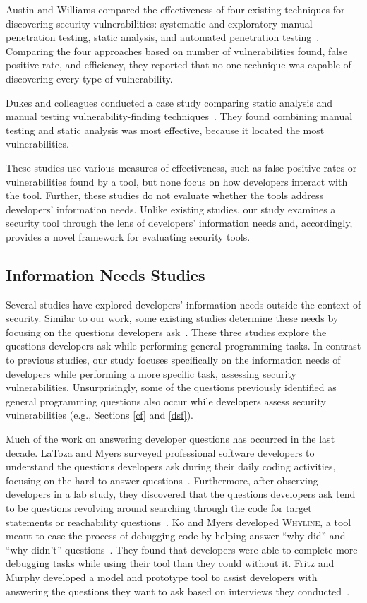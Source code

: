 \documentclass[10pt,journal,compsoc]{IEEEtran}
\begin{document}
Austin and Williams compared the effectiveness of four existing techniques for discovering security vulnerabilities: systematic and exploratory manual  penetration testing, static analysis, and automated penetration testing~\cite{austin2011one}. 
Comparing the four approaches based on number of vulnerabilities found, false positive rate, and efficiency, they reported that no one technique was capable of discovering every type of vulnerability. 

Dukes and colleagues conducted a case study comparing static analysis and manual testing vulnerability-finding techniques~\cite{dukes2013case}. 
They found combining manual testing and static analysis was most effective, because it located the most vulnerabilities.

These studies use various measures of effectiveness, such as false positive rates or vulnerabilities found by a tool, but none focus on how developers interact with the tool. 
Further, these studies do not evaluate whether the tools address developers' information needs. 
Unlike existing studies, our study examines a security tool through the lens of developers' information needs and, accordingly, provides a novel framework for evaluating security tools.

\subsection{Information Needs Studies}
\label{questions}
Several studies have explored developers' information needs outside the context of security.
Similar to our work, some existing studies determine these needs by focusing on the questions developers ask~\cite{latoza2010hard, latoza2010developers, Ko:2007:information, Sillito:2006questions}.
These three studies explore the questions developers ask while performing general programming tasks.
In contrast to previous studies, our study focuses specifically on the information needs of developers while performing a more specific task, assessing security vulnerabilities.
Unsurprisingly, some of the questions previously identified as general programming questions also occur while developers assess security vulnerabilities (e.g., Sections \ref{cf} and \ref{dsf}).

Much of the work on answering developer questions has occurred in the last decade. 
LaToza and Myers surveyed professional software developers to understand the questions developers ask during their daily coding activities, focusing on the hard to answer questions~\cite{latoza2010hard}. 
Furthermore, after observing developers in a lab study, they discovered that the questions developers ask tend to be questions revolving around searching through the code for target statements or reachability questions~\cite{latoza2010developers}. 
Ko and Myers developed \textsc{Whyline}, a tool meant to ease the process of debugging code by helping answer ``why did'' and ``why didn't'' questions~\cite{ko2004designing}. 
They found that developers were able to complete more debugging tasks while using their tool than they could without it.
Fritz and Murphy developed a model and prototype tool to assist developers with answering the questions they want to ask based on interviews they conducted~\cite{fritz2010using}.
\end{document}
